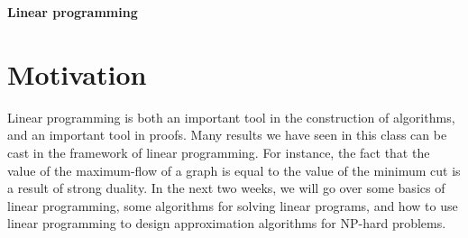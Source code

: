 \documentclass{article}
\begin{document}
%


%
%
%
%

%




\begin{center}
{\Large \bf Linear programming}
\end{center}

\section{Motivation}

Linear programming is both an important tool in the construction of
algorithms, and an important tool in proofs.  Many results we have
seen in this class can be cast in the framework of linear programming.
For instance, the fact that the value of the maximum-flow of a graph
is equal to the value of the minimum cut is a result of strong
duality.  In the next two weeks, we will go over some basics of linear
programming, some algorithms for solving linear programs, and how to
use linear programming to design approximation algorithms for NP-hard
problems.
\end{document}

